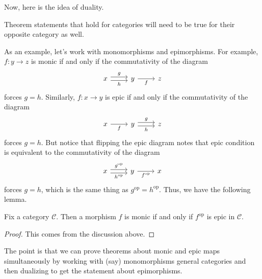 \documentclass[../notes.tex]{subfiles}
\begin{document}
Now, here is the idea of duality.
\begin{idea}
	Theorem statements that hold for categories will need to be true for their opposite category as well.
\end{idea}
As an example, let's work with monomorphisms and epimorphisms. For example, $f:y\to z$ is monic if and only if the commutativity of the diagram
\[\begin{tikzcd}
	x & y & z
	\arrow["g", shift left=1, from=1-1, to=1-2]
	\arrow["h"', shift right=1, from=1-1, to=1-2]
	\arrow["f"', from=1-2, to=1-3]
\end{tikzcd}\]
forces $g=h$. Similarly, $f:x\to y$ is epic if and only if the commutativity of the diagram
\[\begin{tikzcd}
	x & y & z
	\arrow["g", shift left=1, from=1-2, to=1-3]
	\arrow["h"', shift right=1, from=1-2, to=1-3]
	\arrow["f"', from=1-1, to=1-2]
\end{tikzcd}\]
forces $g=h$. But notice that flipping the epic diagram notes that epic condition is equivalent to the commutativity of the diagram
\[\begin{tikzcd}
	x & y & x
	\arrow["{g^\mathrm{op}}", shift left=1, from=1-1, to=1-2]
	\arrow["{h^\mathrm{op}}"', shift right=1, from=1-1, to=1-2]
	\arrow["{f^\mathrm{op}}"', from=1-2, to=1-3]
\end{tikzcd}\]
forces $g=h$, which is the same thing as $g^\mathrm{op}=h^\mathrm{op}$. Thus, we have the following lemma.
\begin{lemma}
	Fix a category $\mathcal C$. Then a morphism $f$ is monic if and only if $f^\mathrm{op}$ is epic in $\mathcal C$.
\end{lemma}
\begin{proof}
	This comes from the discussion above.
\end{proof}
The point is that we can prove theorems about monic and epic maps simultaneously by working with (say) monomorphisms general categories and then dualizing to get the statement about epimorphisms.
\end{document}
